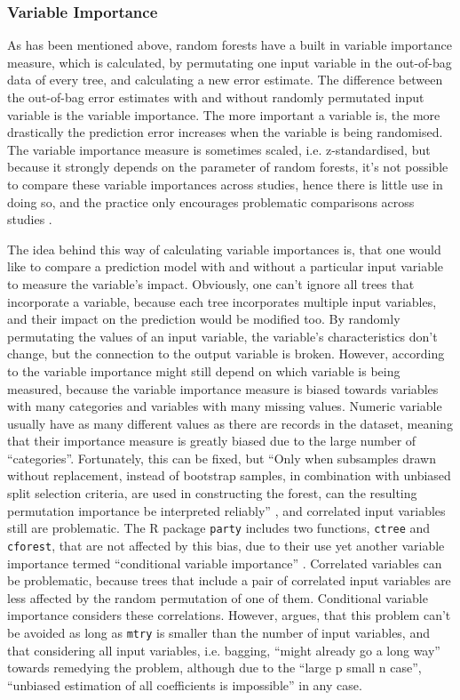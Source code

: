 \documentclass[a4paper,man,12pt,apacite,floatsintext,draftfirst]{apa6} %
\begin{document}
\subsubsection{Variable Importance}
As has been mentioned above, random forests have a built in variable
importance measure, which is calculated, by permutating one input variable
in the out-of-bag data of every tree, and calculating a new error estimate.
The difference between the out-of-bag error estimates with and without
randomly permutated input variable is the variable importance.
The more important a variable is, the more drastically the prediction error
increases when the variable is being randomised.
The variable importance measure is sometimes scaled, i.e. z-standardised,
but because it strongly depends on the parameter of random forests,
it's not possible to compare these variable importances across studies,
hence there is little use in doing so, and the practice only encourages
problematic comparisons across studies \cite{strobl2009introduction}.

The idea behind this way of calculating variable importances is,
that one would like to compare a prediction model with and without a
particular input variable to measure the variable's impact.
Obviously, one can't ignore all trees that incorporate a variable,
because each tree incorporates multiple input variables, and their impact
on the prediction would be modified too.
By randomly permutating the values of an input variable,
the variable's characteristics don't change, but the connection to the
output variable is broken.
However, according to \cite{strobl2007bias} the variable importance might
still depend on which variable is being measured, because the
variable importance measure is biased towards variables with many categories
and variables with many missing values.
Numeric variable usually have as many different values as there are records
in the dataset, meaning that their importance measure is greatly biased due
to the large number of “categories”.
Fortunately, this can be fixed, but “Only when subsamples drawn without
replacement, instead of bootstrap samples, in combination with unbiased
split selection criteria, are used in constructing the forest, can the
resulting permutation importance be interpreted reliably”
\cite{strobl2007bias}, and correlated input variables still are
problematic.
The R package \texttt{party} includes two functions, \texttt{ctree} and
\texttt{cforest}, that are not affected by this bias, due to their use
yet another variable importance termed “conditional variable importance”
\cite{strobl2008conditional}.
Correlated variables can be problematic, because trees that include a
pair of correlated input variables are less affected by the random
permutation of one of them.
Conditional variable importance considers these correlations.
However, \cite{gromping2009variable} argues, that this problem can't be avoided
as long as \texttt{mtry} is smaller than the number of input variables,
and that considering all input variables, i.e. bagging,
“might already go a long way” towards remedying the problem,
although due to the “large p small n case”, “unbiased estimation of all
coefficients is impossible” in any case.
\end{document}
